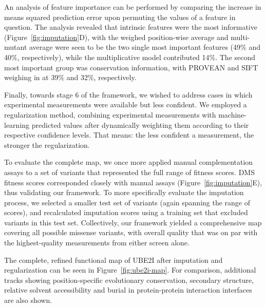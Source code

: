An analysis of feature importance can be performed by comparing the increase in means squared prediction error upon permuting the values of a feature in question. The analysis revealed that intrinsic features were the most informative (Figure~\ref{fig:imputation}D), with the weighed position-wise average and multi-mutant average were seen to be the two single most important features (49\% and 40\%, respectively), while the multiplicative model contributed 14\%. The second most important group was conservation information, with PROVEAN and SIFT weighing in at 39\% and 32\%, respectively.

Finally, towards stage 6 of the framework, we wished to address cases in which experimental measurements were available but less confident. We employed a regularization method, combining experimental measurements with machine-learning predicted values after dynamically weighting them according to their respective confidence levels. That means: the less confident a measurement, the stronger the regularization. 


To evaluate the complete map, we once more applied manual complementation assays to a set of variants that represented the full range of fitness scores.  DMS fitness scores corresponded closely with manual assays (Figure~\ref{fig:imputation}E), thus validating our framework.  To more specifically evaluate the imputation process, we selected a smaller test set of variants (again spanning the range of scores), and recalculated imputation scores using a training set that excluded variants in this test set.  Collectively, our framework yielded a comprehensive map covering all possible missense variants, with overall quality that was on par with the highest-quality measurements from either screen alone.

The complete, refined functional map of UBE2I after imputation and regularization can be seen in Figure~\ref{fig:ube2i-map}. For comparison, additional tracks showing position-specific evolutionary conservation, secondary  structure, relative solvent accessibility and burial in protein-protein interaction interfaces are also shown.  

